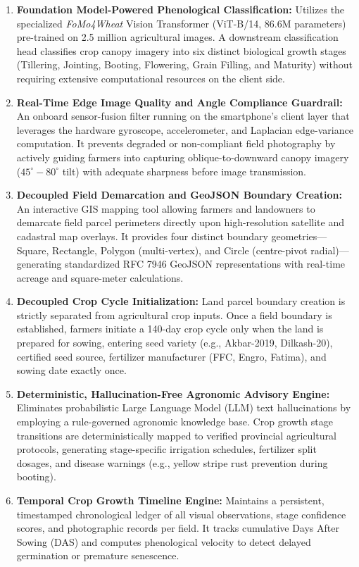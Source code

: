 \begin{enumerate}
    \item \textbf{Foundation Model-Powered Phenological Classification:} Utilizes the specialized \textit{FoMo4Wheat} Vision Transformer (ViT-B/14, 86.6M parameters) pre-trained on 2.5 million agricultural images. A downstream classification head classifies crop canopy imagery into six distinct biological growth stages (Tillering, Jointing, Booting, Flowering, Grain Filling, and Maturity) without requiring extensive computational resources on the client side.
    \item \textbf{Real-Time Edge Image Quality and Angle Compliance Guardrail:} An onboard sensor-fusion filter running on the smartphone's client layer that leverages the hardware gyroscope, accelerometer, and Laplacian edge-variance computation. It prevents degraded or non-compliant field photography by actively guiding farmers into capturing oblique-to-downward canopy imagery ($45^\circ - 80^\circ$ tilt) with adequate sharpness before image transmission.
    \item \textbf{Decoupled Field Demarcation and GeoJSON Boundary Creation:} An interactive GIS mapping tool allowing farmers and landowners to demarcate field parcel perimeters directly upon high-resolution satellite and cadastral map overlays. It provides four distinct boundary geometries---Square, Rectangle, Polygon (multi-vertex), and Circle (centre-pivot radial)---generating standardized RFC 7946 GeoJSON representations with real-time acreage and square-meter calculations.
    \item \textbf{Decoupled Crop Cycle Initialization:} Land parcel boundary creation is strictly separated from agricultural crop inputs. Once a field boundary is established, farmers initiate a 140-day crop cycle only when the land is prepared for sowing, entering seed variety (e.g., Akbar-2019, Dilkash-20), certified seed source, fertilizer manufacturer (FFC, Engro, Fatima), and sowing date exactly once.
    \item \textbf{Deterministic, Hallucination-Free Agronomic Advisory Engine:} Eliminates probabilistic Large Language Model (LLM) text hallucinations by employing a rule-governed agronomic knowledge base. Crop growth stage transitions are deterministically mapped to verified provincial agricultural protocols, generating stage-specific irrigation schedules, fertilizer split dosages, and disease warnings (e.g., yellow stripe rust prevention during booting).
    \item \textbf{Temporal Crop Growth Timeline Engine:} Maintains a persistent, timestamped chronological ledger of all visual observations, stage confidence scores, and photographic records per field. It tracks cumulative Days After Sowing (DAS) and computes phenological velocity to detect delayed germination or premature senescence.

\end{enumerate}
